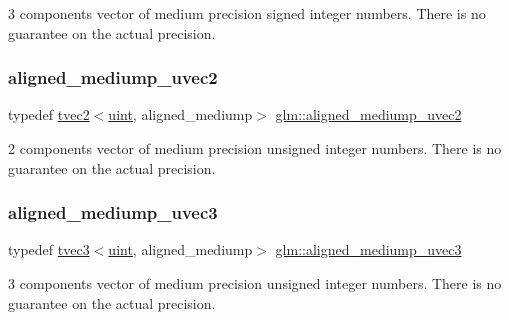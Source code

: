 3 components vector of medium precision signed integer numbers. There is no guarantee on the actual precision. \mbox{\label{group__gtc__type__aligned_ga4f1b08e51e44ae6de175343f10ec54a7}} 
\subsubsection{\texorpdfstring{aligned\+\_\+mediump\+\_\+uvec2}{aligned\_mediump\_uvec2}}
{\footnotesize\ttfamily typedef \hyperlink{structglm_1_1tvec2}{tvec2}$<$\hyperlink{group__core__precision_ga4fd29415871152bfb5abd588334147c8}{uint}, aligned\+\_\+mediump$>$ \hyperlink{group__gtc__type__aligned_ga4f1b08e51e44ae6de175343f10ec54a7}{glm\+::aligned\+\_\+mediump\+\_\+uvec2}}

2 components vector of medium precision unsigned integer numbers. There is no guarantee on the actual precision. \mbox{\label{group__gtc__type__aligned_ga7d2ad25929896f2c0fa15eec440b8074}} 
\subsubsection{\texorpdfstring{aligned\+\_\+mediump\+\_\+uvec3}{aligned\_mediump\_uvec3}}
{\footnotesize\ttfamily typedef \hyperlink{structglm_1_1tvec3}{tvec3}$<$\hyperlink{group__core__precision_ga4fd29415871152bfb5abd588334147c8}{uint}, aligned\+\_\+mediump$>$ \hyperlink{group__gtc__type__aligned_ga7d2ad25929896f2c0fa15eec440b8074}{glm\+::aligned\+\_\+mediump\+\_\+uvec3}}

3 components vector of medium precision unsigned integer numbers. There is no guarantee on the actual precision. \mbox{\label{group__gtc__type__aligned_ga4bbaec6ecf4e72dfdb2ad83b3b8c49b8}} 
